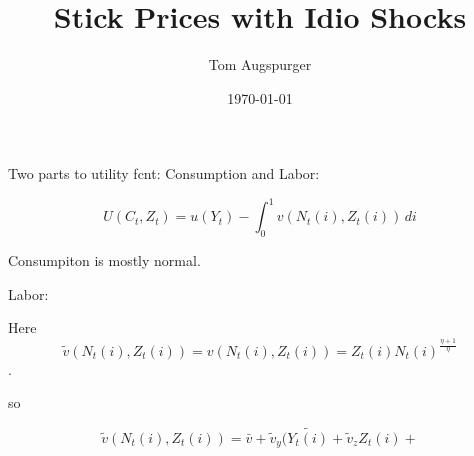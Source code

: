\documentclass[11pt]{article}
\title{Stick Prices with Idio Shocks}
\author{Tom Augspurger}
\date{\today}
\begin{document}
\maketitle

Two parts to utility fcnt: Consumption and Labor:

\begin{equation}
    U(C_t, Z_t) = u(Y_t) - \int_{0}^{1} v(N_t(i), Z_t(i))\, di
\end{equation}

Consumpiton is mostly normal.

Labor:

Here \[ \tilde{v}(N_t(i), Z_t(i)) = v(N_t(i), Z_t(i)) = Z_t(i)N_t(i)^{\frac{\eta + 1}{\eta}} \].

so

\begin{equation}
    \tilde{v}(N_t(i), Z_t(i)) = \bar{v} + \tilde{v}_y(\tilde{Y_t(i)} + \tilde{v}_z Z_t(i) + 
\end{equation}
\end{document}
